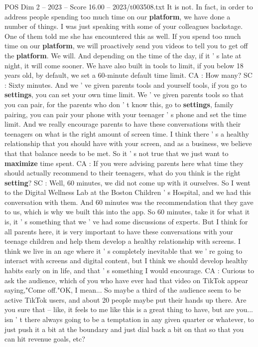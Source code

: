 \begin{textsample}{POS Dim 2 – 2023 – Score 16.00 – 2023/t003508.txt}
It is not.
In fact, in order to address people spending too much time on our \textbf{platform}, we have done a number of things.
I was just speaking with some of your colleagues backstage.
One of them told me she has encountered this as well.
If you spend too much time on our \textbf{platform}, we will proactively send you videos to tell you to get off the \textbf{platform}.
We will.
And depending on the time of the day, if it ' s late at night, it will come sooner.
We have also built in tools to limit, if you below 18 years old, by default, we set a 60-minute default time limit.
CA : How many?
SC : Sixty minutes.
And we ' ve given parents tools and yourself tools, if you go to \textbf{settings}, you can set your own time limit.
We ' ve given parents tools so that you can pair, for the parents who don ' t know this, go to \textbf{settings}, family pairing, you can pair your phone with your teenager ' s phone and set the time limit.
And we really encourage parents to have these conversations with their teenagers on what is the right amount of screen time.
I think there ' s a healthy relationship that you should have with your screen, and as a business, we believe that that balance needs to be met.
So it ' s not true that we just want to \textbf{maximize} time spent.
CA : If you were advising parents here what time they should actually recommend to their teenagers, what do you think is the right \textbf{setting}?
SC : Well, 60 minutes, we did not come up with it ourselves.
So I went to the Digital Wellness Lab at the Boston Children ' s Hospital, and we had this conversation with them.
And 60 minutes was the recommendation that they gave to us, which is why we built this into the app.
So 60 minutes, take it for what it is, it ' s something that we ' ve had some discussions of experts.
But I think for all parents here, it is very important to have these conversations with your teenage children and help them develop a healthy relationship with screens.
I think we live in an age where it ' s completely inevitable that we ' re going to interact with screens and digital content, but I think we should develop healthy habits early on in life, and that ' s something I would encourage.
CA : Curious to ask the audience, which of you who have ever had that video on TikTok appear saying,"Come off."OK, I mean...
So maybe a third of the audience seem to be active TikTok users, and about 20 people maybe put their hands up there.
Are you sure that -- like, it feels to me like this is a great thing to have, but are you... isn ' t there always going to be a temptation in any given quarter or whatever, to just push it a bit at the boundary and just dial back a bit on that so that you can hit revenue goals, etc?

\end{textsample}
